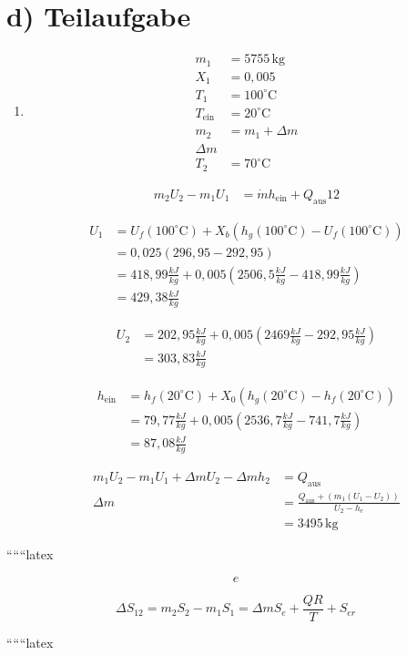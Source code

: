 \section*{d) Teilaufgabe}

\begin{enumerate}
    \item 
    \begin{align*}
        m_1 &= 5755 \, \text{kg} \\
        X_1 &= 0{,}005 \\
        T_1 &= 100^\circ \text{C} \\
        T_{\text{ein}} &= 20^\circ \text{C} \\
        m_2 &= m_1 + \Delta m \\
        \Delta m \\
        T_2 &= 70^\circ \text{C}
    \end{align*}
    
    \begin{align*}
        m_2 U_2 - m_1 U_1 &= \dot{m} h_{\text{ein}} + Q_{\text{aus}} 12
    \end{align*}
    
    
    \begin{align*}
        U_1 &= U_f (100^\circ \text{C}) + X_b \left( h_g (100^\circ \text{C}) - U_f (100^\circ \text{C}) \right) \\
        &= 0{,}025 (296{,}95 - 292{,}95) \\
        &= 418{,}99 \frac{kJ}{kg} + 0{,}005 (2506{,}5 \frac{kJ}{kg} - 418{,}99 \frac{kJ}{kg}) \\
        &= 429{,}38 \frac{kJ}{kg}
    \end{align*}
    
    
    \begin{align*}
        U_2 &= 202{,}95 \frac{kJ}{kg} + 0{,}005 (2469 \frac{kJ}{kg} - 292{,}95 \frac{kJ}{kg}) \\
        &= 303{,}83 \frac{kJ}{kg}
    \end{align*}
    
    
    \begin{align*}
        h_{\text{ein}} &= h_f (20^\circ \text{C}) + X_0 (h_g (20^\circ \text{C}) - h_f (20^\circ \text{C})) \\
        &= 79{,}77 \frac{kJ}{kg} + 0{,}005 (2536{,}7 \frac{kJ}{kg} - 741{,}7 \frac{kJ}{kg}) \\
        &= 87{,}08 \frac{kJ}{kg}
    \end{align*}
    
    \begin{align*}
        m_1 U_2 - m_1 U_1 + \Delta m U_2 - \Delta m h_2 &= Q_{\text{aus}} \\
        \Delta m &= \frac{Q_{\text{aus}} + (m_1 (U_1 - U_2))}{U_2 - h_e} \\
        &= 3495 \, \text{kg}
    \end{align*}
\end{enumerate}

``````latex


\[ 
e 
\]

\[
\Delta S_{12} = m_2 S_2 - m_1 S_1 = \Delta m S_e + \frac{QR}{T} + S_{er}
\]

``````latex